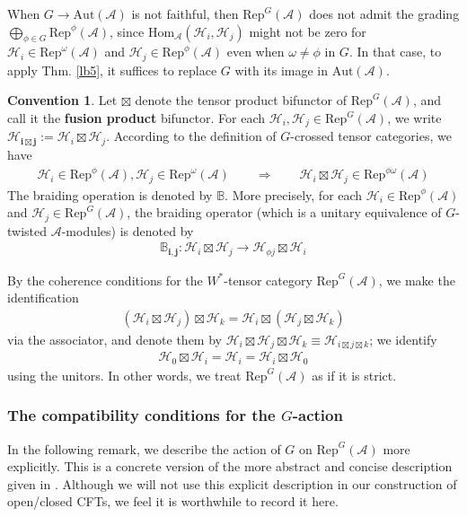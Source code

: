 \documentclass[11pt,b5paper,notitlepage]{article}
\theoremstyle{definition}
\newtheorem{cv}[df]{Convention}
\theoremstyle{plain}
\newcommand{\Hom}{\mathrm{Hom}}
\newcommand{\Rep}{\mathrm{Rep}}
\newcommand{\RepGA}{\mathrm{Rep}^G(\mathcal A)}
\renewcommand{\Bbb}{\mathbb B}
\newcommand{\Aut}{\mathrm{Aut}}
\newcommand{\MA}{\mathcal A}
\newcommand{\MH}{\mathcal H}
\newcommand{\hqed}{\hfill\qedsymbol}
\numberwithin{equation}{section}
\begin{document}
When $G\rightarrow\Aut(\MA)$ is not faithful, then $\RepGA$ does not admit the grading $\bigoplus_{\phi\in G}\Rep^\phi(\MA)$, since $\Hom_\MA(\MH_i,\MH_j)$ might not be zero for $\MH_i\in\Rep^\omega(\MA)$ and $\MH_j\in\Rep^\phi(\MA)$ even when $\omega\neq\phi$ in $G$. In that case, to apply Thm. \ref{lb5}, it suffices to replace $G$ with its image in $\Aut(\MA)$.

\begin{cv}\label{lb9}
Let $\boxtimes$ denote the tensor product bifunctor of $\RepGA$, and call it the \textbf{fusion product} bifunctor. For each $\MH_i,\MH_j\in\RepGA$, we write $\pmb{\MH_{i\boxtimes j}}:=\MH_i\boxtimes\MH_j$. According to the definition of $G$-crossed tensor categories, we have
\begin{align}\label{eq10}
\MH_i\in\Rep^\phi(\MA),\MH_j\in\Rep^\omega(\MA)\qquad\Longrightarrow\qquad\MH_i\boxtimes\MH_j\in\Rep^{\phi\omega}(\MA)
\end{align}
The braiding operation is denoted by  $\pmb{\Bbb}$. More precisely, for each $\MH_i\in\Rep^\phi(\MA)$ and $\MH_j\in\RepGA$, the braiding operator (which is a unitary equivalence of $G$-twisted $\MA$-modules) is denoted by
\begin{align*}
\pmb{\Bbb_{i,j}}:\MH_i\boxtimes\MH_j\rightarrow\MH_{\phi j}\boxtimes\MH_i
\end{align*}

By the coherence conditions for the $W^*$-tensor category $\RepGA$, we make the identification
\begin{align*}
(\MH_i\boxtimes\MH_j)\boxtimes\MH_k=\MH_i\boxtimes(\MH_j\boxtimes\MH_k)
\end{align*}
via the associator, and denote them by $\MH_i\boxtimes\MH_j\boxtimes\MH_k\equiv\MH_{i\boxtimes j\boxtimes k}$; we identify
\begin{align*}
\MH_0\boxtimes\MH_i=\MH_i=\MH_i\boxtimes\MH_0
\end{align*}
using the unitors. In other words, we treat $\RepGA$ as if it is strict.  \hqed
\end{cv}



\subsubsection{The compatibility conditions for the $G$-action}

In the following remark, we describe the action of $G$ on $\RepGA$ more explicitly.  This is a concrete version of the more abstract and concise description given in \cite[Def. 2.8]{MS26a}. Although we will not use this explicit description in our construction of open/closed CFTs, we feel it is worthwhile to record it here.
\end{document}
